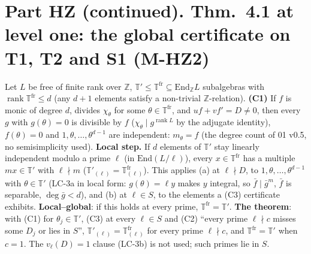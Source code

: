 \chapter{Part HZ (continued). Thm.~4.1 at level one: the global certificate on T1, T2 and S1 (M-HZ2)}

\begin{theorem}\label{inf:heckez-cert}
  \leanok
  Let $L$ be free of finite rank over $\mathbb Z$, $\mathbb T'\le\mathbb T^{\mathrm{fr}}\subseteq\mathrm{End}_{\mathbb Z}L$ subalgebras with
  $\operatorname{rank}\mathbb T^{\mathrm{fr}}\le d$ (any $d+1$ elements satisfy a non-trivial $\mathbb Z$-relation).
  \textbf{(C1)} If $f$ is monic of degree $d$, divides $\chi_\theta$ for some $\theta\in\mathbb T^{\mathrm{fr}}$, and $uf+vf'=D\ne0$, then every
  $g$ with $g(\theta)=0$ is divisible by $f$ ($\chi_\theta\mid g^{\operatorname{rank}L}$ by the adjugate identity), $f(\theta)=0$ and
  $1,\theta,\dots,\theta^{d-1}$ are independent: $m_\theta=f$ (the degree count of 01 v0.5, no semisimplicity used).
  \textbf{Local step.} If $d$ elements of $\mathbb T'$ stay linearly independent modulo a prime $\ell$ (in $\mathrm{End}(L/\ell)$), every
  $x\in\mathbb T^{\mathrm{fr}}$ has a multiple $mx\in\mathbb T'$ with $\ell\nmid m$ ($\mathbb T'_{(\ell)}=\mathbb T^{\mathrm{fr}}_{(\ell)}$). This
  applies (a) at $\ell\nmid D$, to $1,\theta,\dots,\theta^{d-1}$ with $\theta\in\mathbb T'$ (LC-3a in local form: $g(\theta)=\ell y$ makes $y$
  integral, so $\bar f\mid\bar g^{m}$, $\bar f$ is separable, $\deg\bar g<d$), and (b) at $\ell\in S$, to the elements a (C3) certificate
  exhibits. \textbf{Local--global}: if this holds at every prime, $\mathbb T^{\mathrm{fr}}=\mathbb T'$. \textbf{The theorem}: with (C1) for
  $\theta_j\in\mathbb T'$, (C3) at every $\ell\in S$ and (C2) ``every prime $\ell\nmid c$ misses some $D_j$ or lies in $S$'',
  $\mathbb T'_{(\ell)}=\mathbb T^{\mathrm{fr}}_{(\ell)}$ for every prime $\ell\nmid c$, and $\mathbb T^{\mathrm{fr}}=\mathbb T'$ when $c=1$.
  The $v_\ell(D)=1$ clause (LC-3b) is not used; such primes lie in $S$.
\end{theorem}

